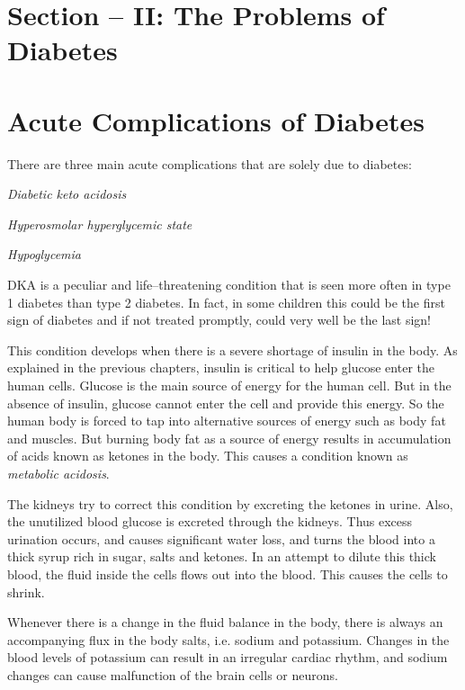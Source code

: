 
\chapter{Section – II: The Problems of Diabetes}

\chapter{Acute Complications of Diabetes}\label{chap10}

There are three main acute complications that are solely due to diabetes:

\item \textit{Diabetic keto acidosis}

 \item \textit{Hyperosmolar hyperglycemic state}

 \item \textit{Hypoglycemia}


DKA is a peculiar and life–threatening condition that is seen more often in type 1 diabetes than type 2 diabetes. In fact, in some children this could be the first sign of diabetes and if not treated promptly, could very well be the last sign!

This condition develops when there is a severe shortage of insulin in the body. As explained in the previous chapters, insulin is critical to help glucose enter the human cells. Glucose is the main source of energy for the human cell. But in the absence of insulin, glucose cannot enter the cell and provide this energy. So the human body is forced to tap into alternative sources of energy such as body fat and muscles. But burning body fat as a source of energy results in accumulation of acids known as ketones in the body. This causes a condition known as \textit{metabolic acidosis}.

The kidneys try to correct this condition by excreting the ketones in urine. Also, the unutilized blood glucose is excreted through the kidneys. Thus excess urination occurs, and causes significant water loss, and turns the blood into a thick syrup rich in sugar, salts and ketones. In an attempt to dilute this thick blood, the fluid inside the cells flows out into the blood. This causes the cells to shrink.

Whenever there is a change in the fluid balance in the body, there is always an accompanying flux in the body salts, i.e. sodium and potassium. Changes in the blood levels of potassium can result in an irregular cardiac rhythm, and sodium changes can cause malfunction of the brain cells or neurons.

